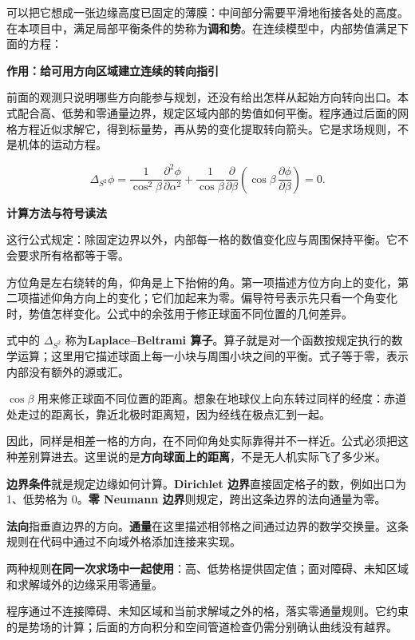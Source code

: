 \documentclass[12pt,a4paper]{article}
\numberwithin{equation}{topic}
\begin{document}
可以把它想成一张边缘高度已固定的薄膜：中间部分需要平滑地衔接各处的高度。在本项目中，满足局部平衡条件的势称为\textbf{调和势}。在连续模型中，内部势值满足下面的方程：

\noindent\textbf{作用：给可用方向区域建立连续的转向指引}\par\nobreak
前面的观测只说明哪些方向能参与规划，还没有给出怎样从起始方向转向出口。本式配合高、低势和零通量边界，规定区域内部的势值如何平衡。程序通过后面的网格方程近似求解它，得到标量势，再从势的变化提取转向箭头。它是求场规则，不是机体的运动方程。

\begin{equation}
\label{eq:laplace}
\Delta_{S^2}\phi
=\frac{1}{\cos^2\beta}\frac{\partial^2\phi}{\partial\alpha^2}
+\frac{1}{\cos\beta}\frac{\partial}{\partial\beta}
\left(\cos\beta\,\frac{\partial\phi}{\partial\beta}\right)=0.
\end{equation}

\noindent\textbf{计算方法与符号读法}\par\nobreak
这行公式规定：除固定边界以外，内部每一格的数值变化应与周围保持平衡。它不会要求所有格都等于零。

方位角是左右绕转的角，仰角是上下抬俯的角。第一项描述方位方向上的变化，第二项描述仰角方向上的变化；它们加起来为零。偏导符号表示先只看一个角变化时，势值怎样变化。公式中的余弦用于修正球面不同位置的几何差异。


式中的 \(\Delta_{S^2}\) 称为\textbf{Laplace–Beltrami 算子}。算子就是对一个函数按规定执行的数学运算；这里用它描述球面上每一小块与周围小块之间的平衡。式子等于零，表示内部没有额外的源或汇。

\(\cos\beta\) 用来修正球面不同位置的距离。想象在地球仪上向东转过同样的经度：赤道处走过的距离长，靠近北极时距离短，因为经线在极点汇到一起。

因此，同样是相差一格的方向，在不同仰角处实际靠得并不一样近。公式必须把这种差别算进去。这里说的是\textbf{方向球面上的距离}，不是无人机实际飞了多少米。

\textbf{边界条件}就是规定边缘如何计算。\textbf{Dirichlet 边界}直接固定格子的数，例如出口为 1、低势格为 0。\textbf{零 Neumann 边界}则规定，跨出这条边界的法向通量为零。

\textbf{法向}指垂直边界的方向。\textbf{通量}在这里描述相邻格之间通过边界的数学交换量。这条规则在代码中通过不向域外格添加连接来实现。

两种规则\textbf{在同一次求场中一起使用}：高、低势格提供固定值；面对障碍、未知区域和求解域外的边缘采用零通量。

程序通过不连接障碍、未知区域和当前求解域之外的格，落实零通量规则。它约束的是势场的计算；后面的方向积分和空间管道检查仍需分别确认曲线没有越界。 
\end{document}
